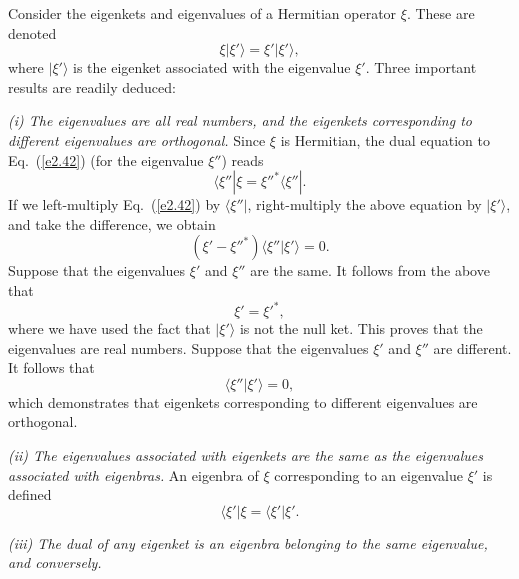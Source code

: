 Consider the eigenkets and eigenvalues of a Hermitian operator $\xi$. These are
denoted
\begin{equation}\label{e2.42}
\xi |\xi'\rangle = \xi' |\xi' \rangle,
\end{equation}
where $|\xi'\rangle$ is the eigenket associated with the eigenvalue $\xi'$.
Three important results are readily deduced:

{\em (i) The eigenvalues are all real numbers, and the eigenkets corresponding
to different eigenvalues are orthogonal.}
Since $\xi$ is Hermitian, the dual equation to Eq.~(\ref{e2.42}) (for the eigenvalue
$\xi''$) reads
\begin{equation}
\langle \xi''|\xi = \xi''^\ast \langle \xi''|.
\end{equation}
If we left-multiply Eq.~(\ref{e2.42}) by $\langle \xi''|$, right-multiply the above
equation by $|\xi'\rangle$, and take the difference, we obtain
\begin{equation}
(\xi' - \xi''^\ast) \langle \xi''|\xi'\rangle = 0.
\end{equation}
Suppose that the eigenvalues $\xi'$ and $\xi''$ are the same. It follows from the
above that
\begin{equation}
\xi' = \xi'^\ast,
\end{equation}
where we have used the fact that $|\xi'\rangle$ is not the null ket. This proves
that the eigenvalues are real numbers. Suppose that the eigenvalues
$\xi'$ and $\xi''$ are different. It follows that
\begin{equation}
\langle \xi''|\xi'\rangle = 0,
\end{equation}
which demonstrates that eigenkets corresponding to different eigenvalues are
 orthogonal.


{\em (ii) The eigenvalues associated with eigenkets are the same as the eigenvalues
associated with eigenbras.} An eigenbra of $\xi$ corresponding to an eigenvalue
$\xi'$ is defined
\begin{equation}
\langle \xi'|\xi = \langle \xi'|\xi'.
\end{equation}

{\em (iii) The dual of any eigenket is an eigenbra belonging to the same eigenvalue,
and conversely.}


